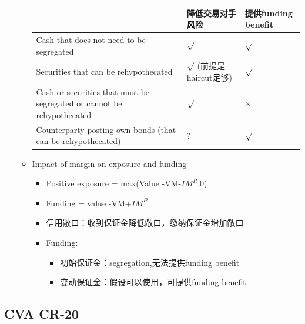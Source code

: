 \begin{itemize}
\begin{itemize}
\begin{tabular}{|p{6cm}|p{3cm}|p{3cm}|}
    \hline
    & \textbf{降低交易对手风险} & \textbf{提供funding benefit} \\
    \hline
    Cash that does not need to be segregated & $\surd$ & $\surd$ \\
    \hline
    Securities that can be rehypothecated & $\surd$ (前提是haircut足够) & $\surd$ \\
    \hline
    Cash or securities that must be segregated or cannot be rehypothecated & $\surd$ & $\times$ \\
    \hline
    Counterparty posting own bonds (that can be rehypothecated) & ? & $\surd$ \\
    \hline
\end{tabular}

\item Impact of margin on exposure and funding
\begin{itemize}
    \item Positive exposure = max(Value -VM-$IM^R$,0)
    \item Funding = value -VM+$IM^P$
    \item 信用敞口：收到保证金降低敞口，缴纳保证金增加敞口
    \item Funding:
    \begin{itemize}
        \item 初始保证金：segregation,无法提供funding benefit
        \item 变动保证金：假设可以使用，可提供funding benefit
    \end{itemize}
\end{itemize}



    \end{itemize}
    
\end{itemize}


\subsection{CVA CR-20}
